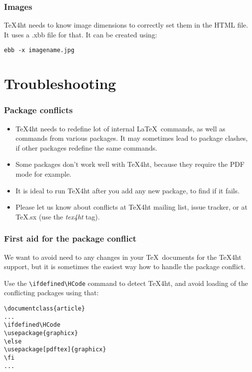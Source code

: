\documentclass{beamer}
\begin{document}
\begin{frame}[fragile]
  \frametitle{Images}
  \TeX4ht needs to know image dimensions to correctly set them in the HTML file. It uses a .xbb file for that. It can be created using:

\begin{verbatim}
ebb -x imagename.jpg
\end{verbatim}
\end{frame}

\section{Troubleshooting}
\begin{frame}[fragile]
\frametitle{Package conflicts}
\begin{itemize}
  \item \TeX4ht needs to redefine lot of internal \LaTeX\ commands, as well as commands from various packages. It may sometimes lead to 
    package clashes, if other packages redefine the same commands.
  \item Some packages don't work well with \TeX4ht, because they require the PDF mode for example.
  \item It is ideal to run \TeX4ht after you add any new package, to find if it fails.
  \item Please let us know about conflicts at \TeX4ht mailing list, issue tracker, or at TeX.sx (use the \textit{tex4ht} tag).
\end{itemize}
\end{frame}
\begin{frame}[fragile]
  \frametitle{First aid for the package conflict}
  We want to avoid need to any changes in your \TeX\ documents for the \TeX4ht support, but it is sometimes the easiest way how to 
  handle the package conflict.

Use the \verb|\ifdefined\HCode| command to detect \TeX4ht, and avoid loading of the conflicting packages using that:

\begin{verbatim}
\documentclass{article}
...
\ifdefined\HCode
\usepackage{graphicx}
\else
\usepackage[pdftex]{graphicx}
\fi
...
\end{verbatim}

\end{frame}
\end{document}
